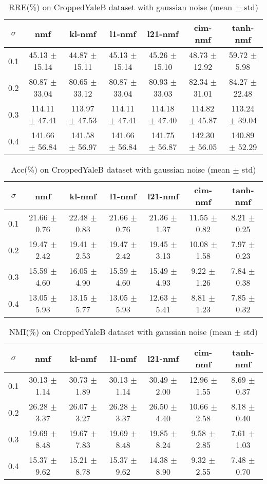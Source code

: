\documentclass{article} %
\begin{document}
\begin{table}
\begin{tabular}{c|cccccc}$\sigma$ & nmf & kl-nmf & l1-nmf & l21-nmf & cim-nmf & tanh-nmf \\\hline
0.1 & 45.13 $\pm$ 15.14 & 44.87 $\pm$ 15.11 & 45.13 $\pm$ 15.14 & 45.26 $\pm$ 15.10 & 48.73 $\pm$ 12.92 & 59.72 $\pm$ 5.98 \\
0.2 & 80.87 $\pm$ 33.04 & 80.65 $\pm$ 33.12 & 80.87 $\pm$ 33.04 & 80.93 $\pm$ 33.03 & 82.34 $\pm$ 31.01 & 84.27 $\pm$ 22.48 \\
0.3 & 114.11 $\pm$ 47.41 & 113.97 $\pm$ 47.53 & 114.11 $\pm$ 47.41 & 114.18 $\pm$ 47.40 & 114.82 $\pm$ 45.87 & 113.24 $\pm$ 39.04 \\
0.4 & 141.66 $\pm$ 56.84 & 141.58 $\pm$ 56.97 & 141.66 $\pm$ 56.84 & 141.75 $\pm$ 56.87 & 142.30 $\pm$ 56.05 & 140.89 $\pm$ 52.29 \\
\end{tabular}\caption{
  RRE(\%) on CroppedYaleB dataset with gaussian noise (mean $\pm$ std)
  \label{tab:RRE-CroppedYaleB-gaussian}
}\end{table}
\begin{table}
\begin{tabular}{c|cccccc}$\sigma$ & nmf & kl-nmf & l1-nmf & l21-nmf & cim-nmf & tanh-nmf \\\hline
0.1 & 21.66 $\pm$ 0.76 & 22.48 $\pm$ 0.83 & 21.66 $\pm$ 0.76 & 21.36 $\pm$ 1.37 & 11.55 $\pm$ 0.82 & 8.21 $\pm$ 0.25 \\
0.2 & 19.47 $\pm$ 2.42 & 19.41 $\pm$ 2.53 & 19.47 $\pm$ 2.42 & 19.45 $\pm$ 3.13 & 10.08 $\pm$ 1.58 & 7.97 $\pm$ 0.23 \\
0.3 & 15.59 $\pm$ 4.60 & 16.05 $\pm$ 4.90 & 15.59 $\pm$ 4.60 & 15.49 $\pm$ 4.93 & 9.22 $\pm$ 1.26 & 7.84 $\pm$ 0.38 \\
0.4 & 13.05 $\pm$ 5.93 & 13.15 $\pm$ 5.77 & 13.05 $\pm$ 5.93 & 12.63 $\pm$ 5.41 & 8.81 $\pm$ 1.23 & 7.85 $\pm$ 0.32 \\
\end{tabular}\caption{
  Acc(\%) on CroppedYaleB dataset with gaussian noise (mean $\pm$ std)
  \label{tab:Acc-CroppedYaleB-gaussian}
}\end{table}
\begin{table}
\begin{tabular}{c|cccccc}$\sigma$ & nmf & kl-nmf & l1-nmf & l21-nmf & cim-nmf & tanh-nmf \\\hline
0.1 & 30.13 $\pm$ 1.14 & 30.73 $\pm$ 1.89 & 30.13 $\pm$ 1.14 & 30.49 $\pm$ 2.00 & 12.96 $\pm$ 1.55 & 8.69 $\pm$ 0.37 \\
0.2 & 26.28 $\pm$ 3.37 & 26.07 $\pm$ 3.27 & 26.28 $\pm$ 3.37 & 26.50 $\pm$ 4.40 & 10.66 $\pm$ 2.58 & 8.18 $\pm$ 0.40 \\
0.3 & 19.69 $\pm$ 8.48 & 19.67 $\pm$ 7.83 & 19.69 $\pm$ 8.48 & 19.85 $\pm$ 8.24 & 9.58 $\pm$ 2.85 & 7.61 $\pm$ 1.03 \\
0.4 & 15.37 $\pm$ 9.62 & 15.21 $\pm$ 8.78 & 15.37 $\pm$ 9.62 & 14.38 $\pm$ 8.90 & 9.32 $\pm$ 2.55 & 7.48 $\pm$ 0.70 \\
\end{tabular}\caption{
  NMI(\%) on CroppedYaleB dataset with gaussian noise (mean $\pm$ std)
  \label{tab:NMI-CroppedYaleB-gaussian}
}\end{table}
\end{document}
